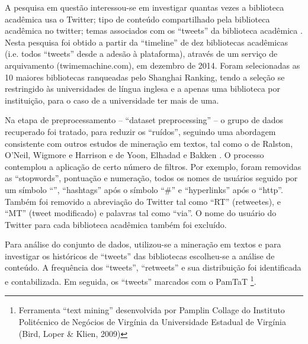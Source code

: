 A pesquisa em questão interessou-se em investigar quantas vezes a biblioteca acadêmica usa o Twitter; tipo de conteúdo compartilhado pela biblioteca acadêmica no twitter; temas associados com os ``tweets'' da biblioteca acadêmica \cite{Al-Daihani2016}. Nesta pesquisa foi obtido a partir da ``timeline'' de dez bibliotecas acadêmicas (i.e. todos ``tweets'' desde a adesão à plataforma), através de um serviço de arquivamento (twimemachine.com), em dezembro de 2014. Foram selecionadas as 10 maiores bibliotecas ranqueadas pelo Shanghai Ranking, tendo a seleção se restringido às universidades de língua inglesa e a apenas uma biblioteca por instituição, para o caso de a universidade ter mais de uma. 

Na etapa de preprocessamento -- ``dataset preprocessing'' -- o grupo de dados recuperado foi tratado, para reduzir os ``ruídos'', seguindo uma abordagem consistente com outros estudos de mineração em textos, tal como o de Ralston, O'Neil, Wigmore e Harrison \cite{ralston2014exploration} e de Yoon, Elhadad e Bakken \cite{yoon2013practical}. O processo contemplou a aplicação de certo número de filtros. Por exemplo, foram removidas as ``stopwords'', pontuação e numeração, todos os nomes de usuários seguido por um símbolo ``\@'', ``hashtags'' após o símbolo ``\#'' e ``hyperlinks'' após o ``http''. Também foi removido a abreviação do Twitter tal como ``RT'' (retweetes), e ``MT'' (tweet modificado) e palavras tal como ``via''. O nome do usuário do Twitter para cada biblioteca acadêmica também foi excluído. 

Para análise do conjunto de dados, utilizou-se a mineração em textos e para investigar os históricos de ``tweets'' das bibliotecas escolheu-se a análise de conteúdo. A frequência dos ``tweets'', ``retweets'' e sua distribuição foi identificada e contabilizada. Em seguida, os ``tweets'' marcados com o PamTaT \footnote{ Ferramenta ``text mining'' desenvolvida por Pamplin Collage do Instituto Politécnico de Negócios de Virgínia da Universidade Estadual de Virgínia (Bird, Loper \& Klien, 2009)}. 

